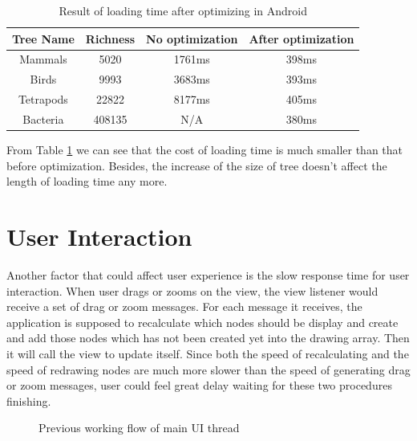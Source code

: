 \documentclass[a4paper,11pt,twoside]{report}
\begin{document}
\begin{table} [H]
	\centering %
	\begin{tabular}{|c c c c|} %
		\hline %
		Tree Name & Richness  & No optimization  & After optimization \\%
		\hline  %
		Mammals & 5020 & 1761ms & 398ms   \\  %
		\hline
		Birds & 9993 & 3683ms & 393ms  \\
		\hline
		Tetrapods & 22822 & 8177ms & 405ms   \\ 
		\hline %
		Bacteria & 408135 & N/A & 380ms  \\ [1ex] %
		\hline
	\end{tabular}
	\caption{Result of loading time after optimizing in Android} %
	\label{table:loadingCamparison} %
\end{table}


From Table \ref{table:loadingCamparison} we can see that the cost of loading time is much smaller than that before optimization. Besides, the increase of the size of tree doesn't affect the length of loading time any more.

\section{User Interaction}

Another factor that could affect user experience is the slow response time for user interaction. 
When user drags or zooms on the view, the view listener would receive a set of drag or zoom messages. For each message it receives, the application is supposed to recalculate which nodes should be display and create and add those nodes which has not been created yet into the drawing array. Then it will call the view to update itself. Since both the speed of recalculating and the speed of redrawing nodes are much more slower than the speed of generating drag or zoom messages, user could feel great delay waiting for these two procedures finishing.


\begin{figure}[H]
\caption{Previous working flow of main UI thread}
\end{figure}
\end{document}

